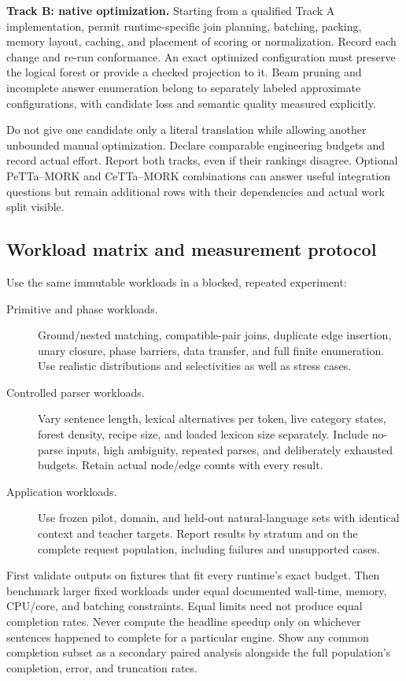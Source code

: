 \documentclass[11pt,a4paper]{article}
\begin{document}
\textbf{Track B: native optimization.}
Starting from a qualified Track A implementation, permit runtime-specific
join planning, batching, packing, memory layout, caching, and placement of
scoring or normalization. Record each change and re-run conformance.
An exact optimized configuration must preserve the logical forest or provide
a checked projection to it. Beam pruning and incomplete answer enumeration
belong to separately labeled approximate configurations, with candidate
loss and semantic quality measured explicitly.

Do not give one candidate only a literal translation while allowing another
unbounded manual optimization. Declare comparable engineering budgets and
record actual effort. Report both tracks, even if their rankings disagree.
Optional PeTTa--MORK and CeTTa--MORK combinations can answer useful
integration questions but remain additional rows with their dependencies
and actual work split visible.

\subsection{Workload matrix and measurement protocol}
Use the same immutable workloads in a blocked, repeated experiment:
\begin{description}
  \item[Primitive and phase workloads.]
  Ground/nested matching, compatible-pair joins, duplicate edge insertion,
  unary closure, phase barriers, data transfer, and full finite enumeration.
  Use realistic distributions and selectivities as well as stress cases.
  \item[Controlled parser workloads.]
  Vary sentence length, lexical alternatives per token, live category
  states, forest density, recipe size, and loaded lexicon size separately.
  Include no-parse inputs, high ambiguity, repeated parses, and deliberately
  exhausted budgets. Retain actual node/edge counts with every result.
  \item[Application workloads.]
  Use frozen pilot, domain, and held-out natural-language sets with identical
  context and teacher targets. Report results by stratum and on the complete
  request population, including failures and unsupported cases.
\end{description}

First validate outputs on fixtures that fit every runtime's exact budget.
Then benchmark larger fixed workloads under equal documented wall-time,
memory, CPU/core, and batching constraints. Equal limits need not produce
equal completion rates. Never compute the headline speedup only on whichever
sentences happened to complete for a particular engine. Show any common
completion subset as a secondary paired analysis alongside the full
population's completion, error, and truncation rates.
\end{document}
